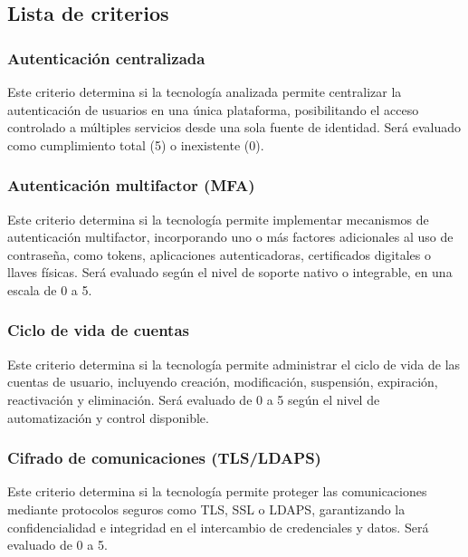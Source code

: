 \subsection{Lista de criterios}\label{subsec:dar-lista-criterios}

\subsubsection{Autenticación centralizada}

Este criterio determina si la tecnología analizada permite centralizar la autenticación de usuarios en una única plataforma, posibilitando el acceso controlado a múltiples servicios desde una sola fuente de identidad. Será evaluado como cumplimiento total (5) o inexistente (0).

\subsubsection{Autenticación multifactor (\texorpdfstring{\acs{MFA}}{MFA})}

Este criterio determina si la tecnología permite implementar mecanismos de autenticación multifactor, incorporando uno o más factores adicionales al uso de contraseña, como tokens, aplicaciones autenticadoras, certificados digitales o llaves físicas. Será evaluado según el nivel de soporte nativo o integrable, en una escala de 0 a 5.

\subsubsection{Ciclo de vida de cuentas}

Este criterio determina si la tecnología permite administrar el ciclo de vida de las cuentas de usuario, incluyendo creación, modificación, suspensión, expiración, reactivación y eliminación. Será evaluado de 0 a 5 según el nivel de automatización y control disponible.

\subsubsection{Cifrado de comunicaciones (\texorpdfstring{\acs{TLS}/\acs{LDAPS}}{TLS/LDAPS})}

Este criterio determina si la tecnología permite proteger las comunicaciones mediante protocolos seguros como \ac{TLS}, \ac{SSL} o \ac{LDAPS}, garantizando la confidencialidad e integridad en el intercambio de credenciales y datos. Será evaluado de 0 a 5.

